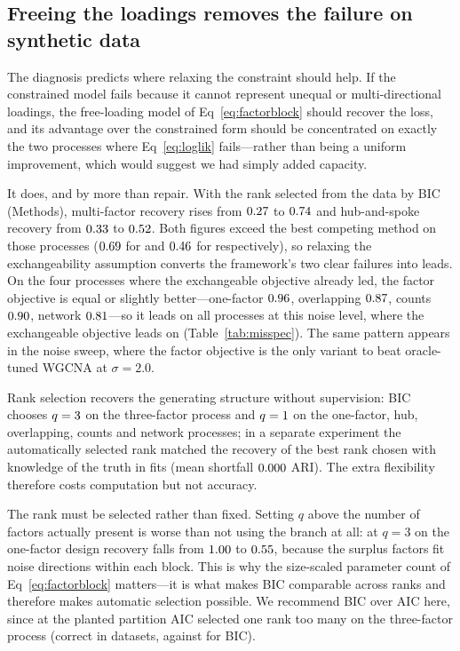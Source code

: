 \subsection*{Freeing the loadings removes the failure on synthetic data}
The diagnosis predicts where relaxing the constraint should help. If the
constrained model fails because it cannot represent unequal or multi-directional
loadings, the free-loading model of Eq~\eqref{eq:factorblock} should recover the
loss, and its advantage over the constrained form should be concentrated on
exactly the two processes where Eq~\eqref{eq:loglik} fails---rather than being a
uniform improvement, which would suggest we had simply added capacity.

It does, and by more than repair. With the rank selected from the data by BIC (Methods), multi-factor recovery rises from
$0.27{}$ to $0.74{}$ and hub-and-spoke recovery
from $0.33{}$ to $0.52{}$. Both figures exceed the best
competing method on those processes ($0.69{}$ for
\MisspecMultiFacBestName{} and $0.46{}$ for
\MisspecHubBestName{} respectively), so relaxing the exchangeability assumption
converts the framework's two clear failures into leads. On the four processes
where the exchangeable objective already led, the factor objective is equal or
slightly better---one-factor $0.96{}$, overlapping
$0.87{}$, counts $0.90{}$, network
$0.81{}$---so it leads on all \MisspecTotal{} processes at this
noise level, where the exchangeable objective leads on \MisspecWins{}
(Table~\ref{tab:misspec}). The same pattern appears in the noise sweep, where the
factor objective is the only variant to beat oracle-tuned WGCNA at $\sigma=2.0$.

Rank selection recovers the generating structure without supervision: BIC chooses
$q=3{}$ on the three-factor process and
$q=1{}$ on the one-factor, hub, overlapping, counts and network processes; in a separate experiment the automatically selected rank matched the recovery of the best rank chosen with knowledge of the truth in \DiagAutoMatches{} fits (mean shortfall $0.000{}$ ARI). The extra flexibility therefore costs computation but
not accuracy.

The rank must be selected rather than fixed. Setting $q$ above the number of
factors actually present is worse than not using the branch at all: at $q=3$ on
the one-factor design recovery falls from $1.00{}$ to $0.55{}$, because the surplus
factors fit noise directions within each block. This is why the size-scaled
parameter count of Eq~\eqref{eq:factorblock} matters---it is what makes BIC
comparable across ranks and therefore makes automatic selection possible. We
recommend BIC over AIC here, since at the planted partition AIC selected one rank too many on the three-factor process (correct in \DiagRankAicMultiFac{} datasets, against \DiagRankBicMultiFac{} for BIC).

